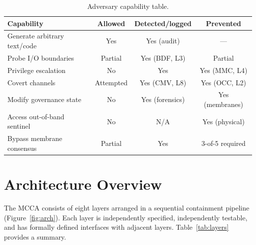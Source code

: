 \documentclass[11pt]{article}
\begin{document}
\begin{table}[h]
\centering
\caption{Adversary capability table.}
\begin{tabular}{lccc}
\toprule
Capability & Allowed & Detected/logged & Prevented \\
\midrule
Generate arbitrary text/code      & Yes     & Yes (audit)       & ---              \\
Probe I/O boundaries              & Partial & Yes (BDF, L3)     & Partial          \\
Privilege escalation              & No      & Yes               & Yes (MMC, L4)    \\
Covert channels                   & Attempted & Yes (CMV, L8)   & Yes (OCC, L2)    \\
Modify governance state           & No      & Yes (forensics)   & Yes (membranes)  \\
Access out-of-band sentinel       & No      & N/A               & Yes (physical)   \\
Bypass membrane consensus         & Partial & Yes               & 3-of-5 required  \\
\bottomrule
\end{tabular}
\end{table}

\section{Architecture Overview}

The MCCA consists of eight layers arranged in a sequential containment
pipeline (Figure~\ref{fig:arch}).
Each layer is independently specified, independently testable, and has
formally defined interfaces with adjacent layers.
Table~\ref{tab:layers} provides a summary.
\end{document}
